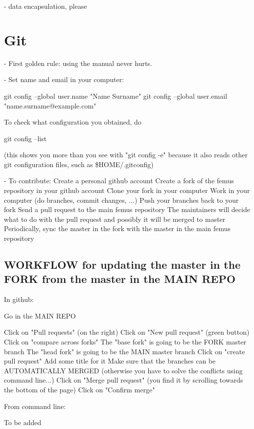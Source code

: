 \documentclass[10pt]{book}
\begin{document}
 - data encapsulation, please
 
 
 
\chapter{Git}


- First golden rule: using the manual never hurts.

- Set name and email in your computer:

  git config --global user.name "Name Surname"
  git config --global user.email "name.surname@example.com"

  To check what configuration you obtained, do 

  git config --list 

  (this shows you more than you see with "git config -e"
  because it also reads other git configuration files,
  such as \$HOME/.gitconfig)

- To contribute:
  Create a personal github account 
  Create a fork of the femus repository in your github account
  Clone your fork in your computer
  Work in your computer (do branches, commit changes, ...)
  Push your branches back to your fork 
  Send a pull request to the main femus repository
  The maintainers will decide what to do with the pull request and possibly it will be merged to master
  Periodically, sync the master in the fork with the master in the main femus repository


\section{WORKFLOW for updating the master in the FORK from the master in the MAIN REPO}


In github:

Go in the MAIN REPO

Click on "Pull requests" (on the right)
Click on "New pull request" (green button)
Click on "compare across forks"
The "base fork" is going to be the FORK master branch
The "head fork" is going to be the MAIN master branch
Click on "create pull request"
Add some title for it
Make sure that the branches can be AUTOMATICALLY MERGED (otherwise you have to solve the conflicts using command line...)
Click on "Merge pull request" (you find it by scrolling towards the bottom of the page)
Click on "Confirm merge"

From command line:

To be added

 
 
\end{document}
